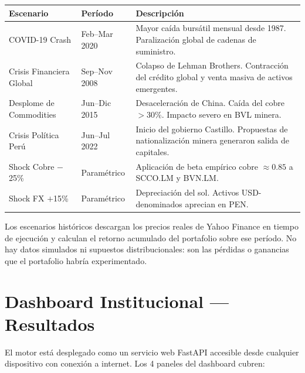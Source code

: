 \documentclass[11pt,a4paper]{article}
\begin{document}
\begin{center}
\begin{tabular}{l l l}
\toprule
\textbf{Escenario} & \textbf{Período} & \textbf{Descripción} \\
\midrule
COVID-19 Crash & Feb--Mar 2020 & \parbox[t]{8.5cm}{Mayor caída bursátil mensual desde 1987. Paralización global de cadenas de suministro.} \\[4pt]
Crisis Financiera Global & Sep--Nov 2008 & \parbox[t]{8.5cm}{Colapso de Lehman Brothers. Contracción del crédito global y venta masiva de activos emergentes.} \\[4pt]
Desplome de Commodities & Jun--Dic 2015 & \parbox[t]{8.5cm}{Desaceleración de China. Caída del cobre $>$30\%. Impacto severo en BVL minera.} \\[4pt]
Crisis Política Perú & Jun--Jul 2022 & \parbox[t]{8.5cm}{Inicio del gobierno Castillo. Propuestas de nationalización minera generaron salida de capitales.} \\[4pt]
Shock Cobre $-$25\% & Paramétrico & \parbox[t]{8.5cm}{Aplicación de beta empírico cobre $\approx 0.85$ a SCCO.LM y BVN.LM.} \\[4pt]
Shock FX $+$15\% & Paramétrico & \parbox[t]{8.5cm}{Depreciación del sol. Activos USD-denominados aprecian en PEN.} \\
\bottomrule
\end{tabular}
\end{center}

Los escenarios históricos descargan los precios reales de Yahoo Finance en tiempo de ejecución
y calculan el retorno acumulado del portafolio sobre ese período. No hay datos simulados ni
supuestos distribucionales: son las pérdidas o ganancias que el portafolio habría experimentado.

\section{Dashboard Institucional — Resultados}

El motor está desplegado como un servicio web FastAPI accesible desde cualquier dispositivo
con conexión a internet. Los 4 paneles del dashboard cubren:
\end{document}
